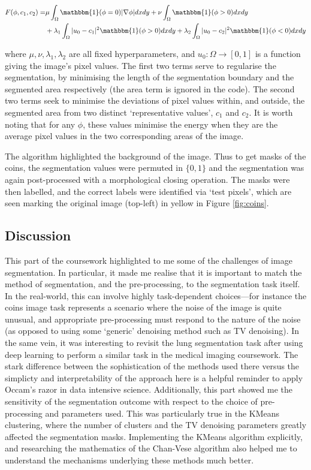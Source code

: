 \documentclass[12pt]{article}
\begin{document}
\begin{align*}
    F(\phi, c_1, c_2) = & \mu\int_{\Omega}\mathbbm{1}(\phi=0)|\nabla\phi|dxdy + \nu\int_{\Omega}\mathbbm{1}(\phi>0)dxdy \\
                    & + \lambda_1\int_{\Omega}|u_0-c_1|^2\mathbbm{1}(\phi>0)dxdy + \lambda_2\int_{\Omega}|u_0-c_2|^2\mathbbm{1}(\phi<0)dxdy \\
\end{align*}

where $\mu,\nu,\lambda_1,\lambda_2$ are all fixed hyperparameters, and $u_0:\Omega\rightarrow[0,1]$ is a function giving the image's pixel values.
The first two terms serve to regularise the segmentation,
by minimising the length of the segmentation boundary and the segmented area respectively (the area term is ignored in the code).
The second two terms seek to minimise the deviations of pixel values within, and outside, the segmented area from two distinct `representative values',
$c_1$ and $c_2$.
It is worth noting that for any $\phi$, these values minimise the energy when they are the average pixel values in the two corresponding areas of the image.

The algorithm highlighted the background of the image.
Thus to get masks of the coins, the segmentation values were permuted in $\lbrace0,1\rbrace$ and the segmentation was again post-processed with a morphological closing operation.
The masks were then labelled, and the correct labels were identified via `test pixels', which are seen marking the original image (top-left) in yellow in Figure \ref{fig:coins}.

\subsection{Discussion}

This part of the coursework highlighted to me some of the challenges of image segmentation.
In particular, it made me realise that it is important to match the method of segmentation,
and the pre-processing, to the segmentation task itself.
In the real-world, this can involve highly task-dependent choices---for instance the coins image task represents a scenario where the noise of the image is quite unusual,
and appropriate pre-processing must respond to the nature of the noise (as opposed to using some `generic' denoising method such as TV denoising).
In the same vein, it was interesting to revisit the lung segmentation task after using deep learning to perform a similar task in the medical imaging coursework.
The stark difference between the sophistication of the methods used there versus the simplicty and interpretability of the approach here is a helpful reminder to apply Occam's razor in data intensive science.
Additionally, this part showed me the sensitivity of the segmentation outcome with respect to the choice of pre-processing and parameters used.
This was particularly true in the KMeans clustering, where the number of clusters and the TV denoising parameters greatly affected the segmentation masks.
Implementing the KMeans algorithm explicitly, and researching the mathematics of the Chan-Vese algorithm also helped me to understand the mechanisms underlying these methods much better.
\end{document}
